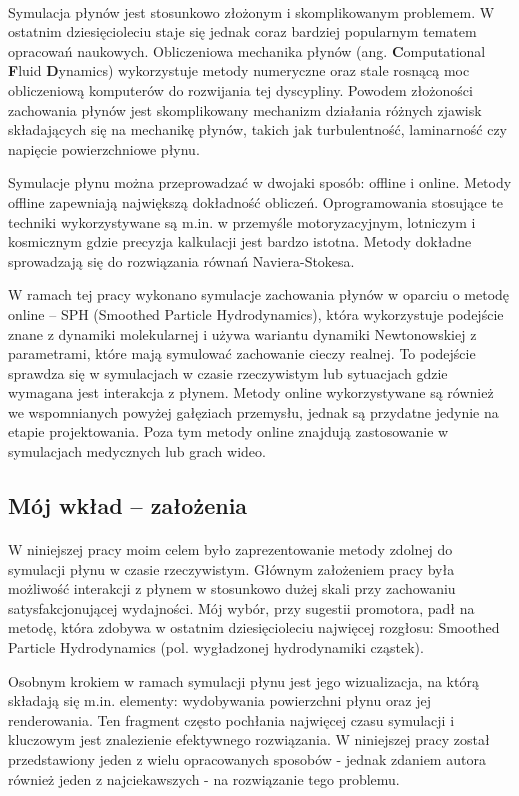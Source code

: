 \paragraph{}
Symulacja płynów jest stosunkowo złożonym i skomplikowanym problemem. W ostatnim dziesięcioleciu staje się jednak coraz bardziej popularnym tematem opracowań naukowych. Obliczeniowa mechanika płynów (ang. \textbf{C}omputational \textbf{F}luid \textbf{D}ynamics) wykorzystuje metody numeryczne oraz stale rosnącą moc obliczeniową komputerów do rozwijania tej dyscypliny. Powodem złożoności zachowania płynów jest skomplikowany mechanizm działania różnych zjawisk składających się na mechanikę płynów, takich jak turbulentność, laminarność czy napięcie powierzchniowe płynu.
\par
Symulacje płynu można przeprowadzać w dwojaki sposób: offline i online. Metody offline zapewniają największą dokładność obliczeń. Oprogramowania stosujące te techniki wykorzystywane są m.in. w przemyśle motoryzacyjnym, lotniczym i kosmicznym gdzie precyzja kalkulacji jest bardzo istotna. Metody dokładne sprowadzają się do rozwiązania równań Naviera-Stokesa.
\par
W ramach tej pracy wykonano symulacje zachowania płynów w oparciu o metodę online -- SPH (Smoothed Particle Hydrodynamics), która wykorzystuje podejście znane z dynamiki molekularnej i używa wariantu dynamiki Newtonowskiej z parametrami, które mają symulować zachowanie cieczy realnej. To podejście sprawdza się w symulacjach w czasie rzeczywistym lub sytuacjach gdzie wymagana jest interakcja z płynem. Metody online wykorzystywane są również we wspomnianych powyżej gałęziach przemysłu, jednak są przydatne jedynie na etapie projektowania. Poza tym metody online znajdują zastosowanie w symulacjach medycznych lub grach wideo.
\par

\subsection{Mój wkład -- założenia}
\paragraph{}
W niniejszej pracy moim celem było zaprezentowanie metody zdolnej do symulacji płynu w czasie rzeczywistym. Głównym założeniem pracy była możliwość interakcji z płynem w stosunkowo dużej skali przy zachowaniu satysfakcjonującej wydajności. Mój wybór, przy sugestii promotora, padł na metodę, która zdobywa w ostatnim dziesięcioleciu najwięcej rozgłosu: Smoothed Particle Hydrodynamics (pol. wygładzonej hydrodynamiki cząstek).
\par
Osobnym krokiem w ramach symulacji płynu jest jego wizualizacja, na którą składają się m.in. elementy: wydobywania powierzchni płynu oraz jej renderowania. Ten fragment często pochłania najwięcej czasu symulacji i kluczowym jest znalezienie efektywnego rozwiązania. W niniejszej pracy został przedstawiony jeden z wielu opracowanych sposobów - jednak zdaniem autora również jeden z najciekawszych - na rozwiązanie tego problemu.
\par
